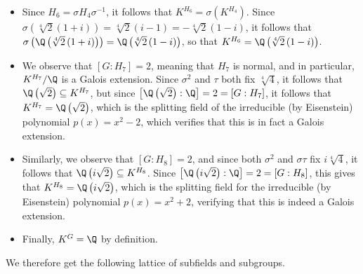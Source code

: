 \documentclass[10pt]{mypackage}
\begin{document}
\begin{solution}
\begin{enumerate}[(a)]
\begin{itemize}
\begin{align*}
\begin{cases}
              i\sqrt[4]{2}\xmapsto{\tau}-i\sqrt[4]{2}\xmapsto{\sigma^2}i\sqrt[4]{2}\\
              i\sqrt[4]{4}\xmapsto{\tau}-i\sqrt[4]{4}\xmapsto{\sigma^2}-i\sqrt[4]{4}\\
              i\sqrt[4]{8}\xmapsto{\tau}-i\sqrt[4]{8}\xmapsto{\sigma^2}i\sqrt[4]{8}.
            \end{cases}
          \end{align*}
          In particular, we observe that the action of $\sigma^2\tau$ fixes $i\sqrt[4]{2}$, so that $\Q\left( i\sqrt[4]{2} \right)\subseteq K^{H_5}$. Since $\left[ \Q\left( i\sqrt[4]{2} \right):\Q \right] = 4 = \left[ G:H_5 \right]$, it follows that this is indeed the fixed field.
        \item Since $H_6 = \sigma H_4 \sigma^{-1}$, it follows that $K^{H_6} = \sigma\left( K^{H_4} \right)$. Since $\sigma\left( \sqrt[4]{2}\left( 1+i \right) \right) = \sqrt[4]{2}\left( i-1 \right) = -\sqrt[4]{2}\left( 1-i \right)$, it follows that $\sigma\left( \Q\left( \sqrt[4]{2}\left( 1+i \right) \right) \right) = \Q\left( \sqrt[4]{2}\left( 1-i \right) \right)$, so that $K^{H_6} = \Q\left( \sqrt[4]{2}\left( 1-i \right) \right)$.
        \item We observe that $\left[ G:H_7 \right] = 2$, meaning that $H_7$ is normal, and in particular, $K^{H_7}/\Q$ is a Galois extension. Since $\sigma^2$ and $\tau$ both fix $\sqrt[4]{4}$, it follows that $\Q\left( \sqrt{2} \right)\subseteq K^{H_7}$, but since $\left[ \Q\left( \sqrt{2} \right):\Q \right] = 2 = \left[ G:H_7 \right]$, it follows that $K^{H_7} = \Q\left( \sqrt{2} \right)$, which is the splitting field of the irreducible (by Eisenstein) polynomial $p(x) = x^2 - 2$, which verifies that this is in fact a Galois extension.
        \item Similarly, we observe that $\left[ G:H_8 \right] = 2$, and since both $\sigma^2$ and $\sigma\tau$ fix $i\sqrt[4]{4}$, it follows that $\Q\left( i\sqrt{2} \right)\subseteq K^{H_8}$. Since $\left[ \Q\left( i\sqrt{2} \right):\Q \right] = 2 = \left[ G:H_8 \right]$, this gives that $K^{H_8} = \Q\left( i\sqrt{2} \right)$, which is the splitting field for the irreducible (by Eisenstein) polynomial $p(x) = x^2 + 2$, verifying that this is indeed a Galois extension.
        \item Finally, $K^{G} = \Q$ by definition.
      \end{itemize}
      We therefore get the following lattice of subfields and subgroups.
      \begin{center}

\end{center}
\end{enumerate}
\end{solution}
\end{document}

